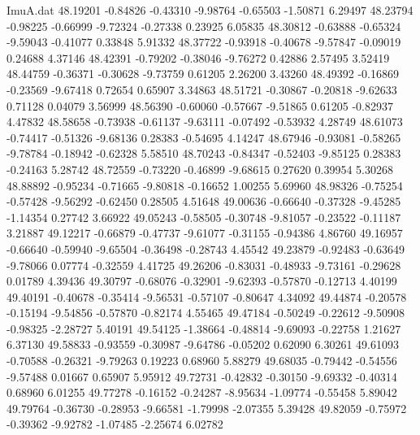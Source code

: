 \begin{filecontents}{ImuA.dat}
  48.19201   -0.84826   -0.43310   -9.98764   -0.65503   -1.50871    6.29497
  48.23794   -0.98225   -0.66999   -9.72324   -0.27338    0.23925    6.05835
  48.30812   -0.63888   -0.65324   -9.59043   -0.41077    0.33848    5.91332
  48.37722   -0.93918   -0.40678   -9.57847   -0.09019    0.24688    4.37146
  48.42391   -0.79202   -0.38046   -9.76272    0.42886    2.57495    3.52419
  48.44759   -0.36371   -0.30628   -9.73759    0.61205    2.26200    3.43260
  48.49392   -0.16869   -0.23569   -9.67418    0.72654    0.65907    3.34863
  48.51721   -0.30867   -0.20818   -9.62633    0.71128    0.04079    3.56999
  48.56390   -0.60060   -0.57667   -9.51865    0.61205   -0.82937    4.47832
  48.58658   -0.73938   -0.61137   -9.63111   -0.07492   -0.53932    4.28749
  48.61073   -0.74417   -0.51326   -9.68136    0.28383   -0.54695    4.14247
  48.67946   -0.93081   -0.58265   -9.78784   -0.18942   -0.62328    5.58510
  48.70243   -0.84347   -0.52403   -9.85125    0.28383   -0.24163    5.28742
  48.72559   -0.73220   -0.46899   -9.68615    0.27620    0.39954    5.30268
  48.88892   -0.95234   -0.71665   -9.80818   -0.16652    1.00255    5.69960
  48.98326   -0.75254   -0.57428   -9.56292   -0.62450    0.28505    4.51648
  49.00636   -0.66640   -0.37328   -9.45285   -1.14354    0.27742    3.66922
  49.05243   -0.58505   -0.30748   -9.81057   -0.23522   -0.11187    3.21887
  49.12217   -0.66879   -0.47737   -9.61077   -0.31155   -0.94386    4.86760
  49.16957   -0.66640   -0.59940   -9.65504   -0.36498   -0.28743    4.45542
  49.23879   -0.92483   -0.63649   -9.78066    0.07774   -0.32559    4.41725
  49.26206   -0.83031   -0.48933   -9.73161   -0.29628    0.01789    4.39436
  49.30797   -0.68076   -0.32901   -9.62393   -0.57870   -0.12713    4.40199
  49.40191   -0.40678   -0.35414   -9.56531   -0.57107   -0.80647    4.34092
  49.44874   -0.20578   -0.15194   -9.54856   -0.57870   -0.82174    4.55465
  49.47184   -0.50249   -0.22612   -9.50908   -0.98325   -2.28727    5.40191
  49.54125   -1.38664   -0.48814   -9.69093   -0.22758    1.21627    6.37130
  49.58833   -0.93559   -0.30987   -9.64786   -0.05202    0.62090    6.30261
  49.61093   -0.70588   -0.26321   -9.79263    0.19223    0.68960    5.88279
  49.68035   -0.79442   -0.54556   -9.57488    0.01667    0.65907    5.95912
  49.72731   -0.42832   -0.30150   -9.69332   -0.40314    0.68960    6.01255
  49.77278   -0.16152   -0.24287   -8.95634   -1.09774   -0.55458    5.89042
  49.79764   -0.36730   -0.28953   -9.66581   -1.79998   -2.07355    5.39428
  49.82059   -0.75972   -0.39362   -9.92782   -1.07485   -2.25674    6.02782

\end{filecontents}
